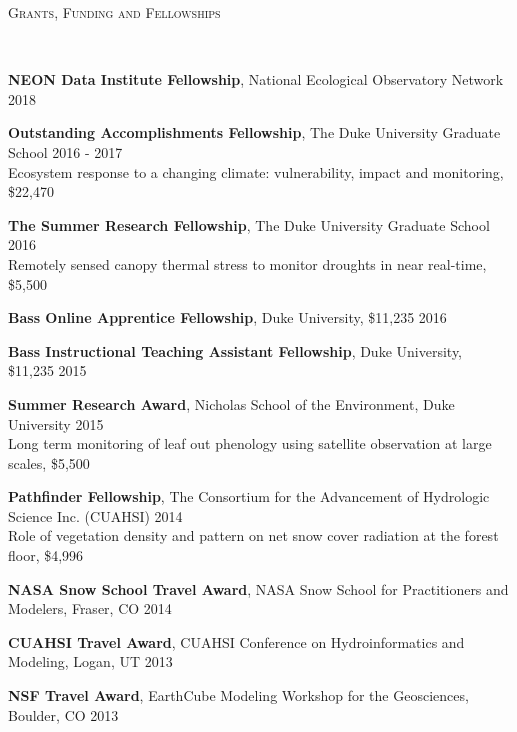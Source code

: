 \documentclass[10pt]{article}
\newenvironment{changemargin}[2]{%
  \begin{list}{}{%
    \setlength{\topsep}{0pt}%
    \setlength{\leftmargin}{#1}%
    \setlength{\rightmargin}{#2}%
    \setlength{\listparindent}{\parindent}%
    \setlength{\itemindent}{\parindent}%
    \setlength{\parsep}{\parskip}%
  }%
  \item[]}{\end{list}
}
\newcommand{\lineover}{
	\begin{changemargin}{-0.05in}{-0.05in}
		\vspace*{-8pt}
		\hrulefill \\
		\vspace*{-2pt}
	\end{changemargin}
}
\newcommand{\header}[1]{
	\begin{changemargin}{-0.5in}{-0.5in}
		\scshape{#1}\\
  	\lineover
	\end{changemargin}
}
\newenvironment{body} {
	\vspace*{-2pt}
	\begin{changemargin}{-0.5in}{-0.5in}
  }
	{\end{changemargin}
}
\begin{document}
\header{Grants, Funding and Fellowships}

\begin{body}

 \textbf{NEON Data Institute Fellowship}, National Ecological Observatory Network  \hfill {2018}\\
 \medskip

\textbf{Outstanding Accomplishments Fellowship}, The Duke University Graduate School \hfill {2016 - 2017}\\
 Ecosystem response to a changing climate: vulnerability, impact and monitoring, \$22,470 \\
 \medskip

 \textbf{The Summer Research Fellowship}, The Duke University Graduate School \hfill {2016}\\
 Remotely sensed canopy thermal stress to monitor droughts in near real-time, \$5,500 \\
 \medskip

  \textbf{Bass Online Apprentice Fellowship}, Duke University, \$11,235 \hfill {2016}\\
 \medskip

  \textbf{Bass Instructional Teaching Assistant Fellowship}, Duke University, \$11,235 \hfill {2015}\\
 \medskip

  \textbf{Summer Research Award}, Nicholas School of the Environment, Duke University \hfill {2015}\\
  Long term monitoring of leaf out phenology using satellite observation at large scales, \$5,500 \\
  \medskip

  \textbf{Pathfinder Fellowship}, The Consortium for the Advancement of Hydrologic Science Inc. (CUAHSI)  \hfill {2014}\\
  Role of vegetation density and pattern on net snow cover radiation at the forest floor, \$4,996\\
  \medskip

	\textbf{NASA Snow School Travel Award},  NASA Snow School for Practitioners and Modelers, Fraser, CO \hfill {2014}\\
	\medskip

	\textbf{CUAHSI Travel Award}, CUAHSI Conference on Hydroinformatics and Modeling, Logan, UT \hfill {2013}\\
	\medskip

	\textbf{NSF Travel Award}, EarthCube Modeling Workshop for the Geosciences, Boulder, CO \hfill {2013}\\ \medskip

\end{body}
\medskip
\end{document}
